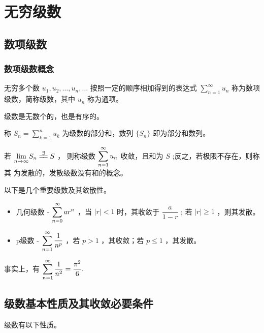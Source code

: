 \chapter{无穷级数}

\section{数项级数}

\subsection{数项级数概念}

\begin{Def}[数项级数]

    无穷多个数 $ u_1,u_2,\dots,u_n,\dots $ 按照一定的顺序相加得到的表达式
     $ \sum_{n=1}^\infty u_n $ 称为数项级数，简称级数，其中 $ u_n $ 称为通项。
\end{Def}

级数是无数个的，也是有序的。

\begin{Def}[级数收敛]

    称 $ S_n = \sum_{k=1}^n u_k $ 为级数的部分和，数列 $ \{S_n\} $ 即为部分和数列。

    若 $ {\displaystyle\lim_{n\rightarrow \infty}}S_n\xlongequal{\exists}S $ ，
    则称级数 $\displaystyle \sum_{n=1}^\infty u_n $ 收敛，且和为 $ S $ ;反之，若极限不存在，则称其
    为发散的，发散级数没有和的概念。
\end{Def}

以下是几个重要级数及其敛散性。

\begin{itemize}
    \item 几何级数 - $\displaystyle \sum_{n=0}^\infty ar^n $ ，当 $ |r|<1 $ 时，其收敛于 $ \dfrac{a}{1-r} $ ;
    若 $ |r|\geq1 $ ，则其发散。
    \item p级数 - $\displaystyle \sum_{n=1}^\infty \dfrac{1}{n^p} $ ，若 $ p > 1 $ ，其收敛；若 $ p\leq 1 $ ，其发散。
\end{itemize}

事实上，有 $\displaystyle \sum_{n=1}^\infty \dfrac{1}{n^2} = \dfrac{\pi^2}{6}. $ 

\section{级数基本性质及其收敛必要条件}

级数有以下性质。

